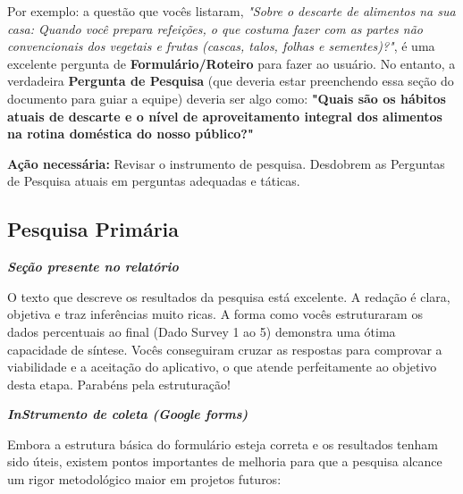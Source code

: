 \documentclass[
  sigconf,
  nonacm, %
  language=portuguese
]{acmart}
\newcommand{\statuswarn}[1]{{\small\bfseries\color{cwarn}#1}}
\begin{document}
Por exemplo: a questão que vocês listaram, \textit{"Sobre o descarte de alimentos na sua casa: Quando você prepara refeições, o que costuma fazer com as partes não convencionais dos vegetais e frutas (cascas, talos, folhas e sementes)?"}, é uma excelente pergunta de \textbf{Formulário/Roteiro} para fazer ao usuário. No entanto, a verdadeira \textbf{Pergunta de Pesquisa} (que deveria estar preenchendo essa seção do documento para guiar a equipe) deveria ser algo como: \textbf{"Quais são os hábitos atuais de descarte e o nível de aproveitamento integral dos alimentos na rotina doméstica do nosso público?"}

\textbf{Ação necessária:} Revisar o instrumento de pesquisa. Desdobrem as Perguntas de Pesquisa atuais em perguntas adequadas e táticas.

\subsection{Pesquisa Primária}

\noindent\statuswarn{0,85\,/\,1,50 pts · Completo c/ ressalvas}

\textit{\textbf{Seção presente no relatório}}

O texto que descreve os resultados da pesquisa está excelente. A redação é clara, objetiva e traz inferências muito ricas. A forma como vocês estruturaram os dados percentuais ao final (Dado Survey 1 ao 5) demonstra uma ótima capacidade de síntese. Vocês conseguiram cruzar as respostas para comprovar a viabilidade e a aceitação do aplicativo, o que atende perfeitamente ao objetivo desta etapa. Parabéns pela estruturação!

\textit{\textbf{InStrumento de coleta (Google forms)}}

Embora a estrutura básica do formulário esteja correta e os resultados tenham sido úteis, existem pontos importantes de melhoria para que a pesquisa alcance um rigor metodológico maior em projetos futuros:
\end{document}
